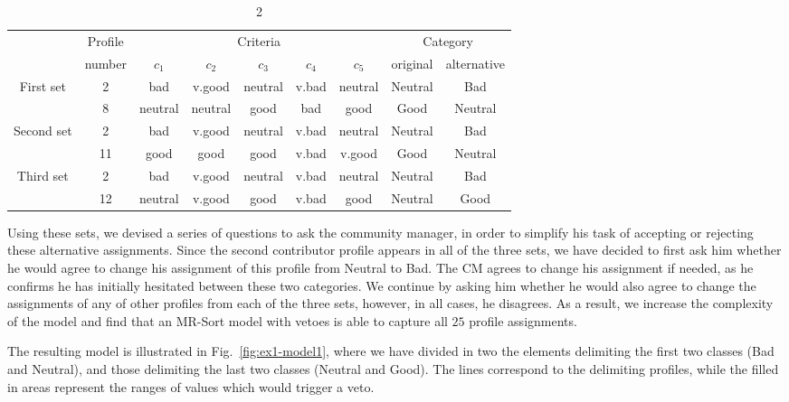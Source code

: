 \begin{table}
\caption{2}\label{tab:ex1-step2}
\small

\begin{tabular}{ccccccc||c|c}
&Profile& \multicolumn{5}{c}{Criteria} & \multicolumn{2}{|c}{Category} \\
&number& $c_1$ & $c_2$ & $c_3$ & $c_4$ & $c_5$ & \multicolumn{1}{c}{original} & \multicolumn{1}{c}{alternative} \\\hline
\multirow{2}{*}{First set}&         2 &        bad &     v.good &    neutral &      v.bad &    neutral &  Neutral & Bad \\
&         8 &    neutral &    neutral &       good &        bad &       good & Good & Neutral \\\hline
         
\multirow{2}{*}{Second set}&         2 &        bad &     v.good &    neutral &      v.bad &    neutral &  Neutral & Bad \\
&        11 &       good &       good &       good &      v.bad &     v.good & Good & Neutral \\\hline
        
\multirow{2}{*}{Third set}&         2 &        bad &     v.good &    neutral &      v.bad &    neutral &  Neutral & Bad \\
&        12 &    neutral &     v.good &       good &      v.bad &       good & Neutral & Good  \\
        
\end{tabular}
\end{table}

Using these sets, we devised a series of questions to ask the community manager, in order to simplify his task of accepting or rejecting these alternative assignments. Since the second contributor profile appears in all of the three sets, we have decided to first ask him whether he would agree to change his assignment of this profile from Neutral to Bad. The CM agrees to change his assignment if needed, as he confirms he has initially hesitated between these two categories. We continue by asking him whether he would also agree to change the assignments of any of other profiles from each of the three sets, however, in all cases, he disagrees. As a result, we increase the complexity of the model and find that an MR-Sort model with vetoes is able to capture all $25$ profile assignments.



The resulting model is illustrated in Fig.~\ref{fig:ex1-model1}, where we have divided in two the elements delimiting the first two classes (Bad and Neutral), and those delimiting the last two classes (Neutral and Good). The lines correspond to the delimiting profiles, while the filled in areas represent the ranges of values which would trigger a veto.

